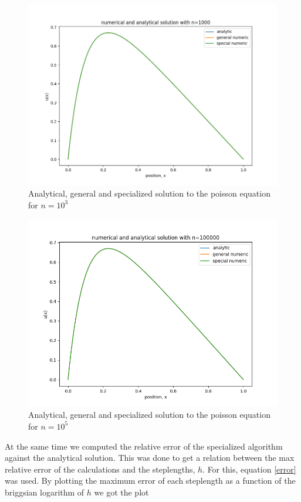 \documentclass[english,a4paper, 11pt]{article}
\begin{document}
\begin{figure}[H]
\centering
\includegraphics[scale=0.5]{poisson_n3.png}
\caption{Analytical, general and specialized solution to the poisson equation for $n = 10^3$}\label{fig2}
\end{figure}

\begin{figure}[H]
\centering
\includegraphics[scale=0.5]{poisson_n5.png}
\caption{Analytical, general and specialized solution to the poisson equation for $n = 10^5$}\label{fig3}
\end{figure}

At the same time we computed the relative error of the specialized algorithm against the analytical solution. This was done to get a relation between the max relative error of the calculations and the steplengths, $h$. For this, equation \ref{error} was used. By plotting the maximum error of each steplength as a function of the briggsian logarithm of $h$ we got the plot 
\end{document}
